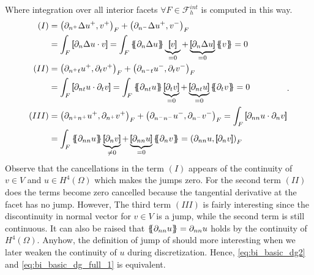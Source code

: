 Where integration over all interior facets $ \forall F \in \mathcal{F}_{h}^{int}$ is computed in this way.
\begin{equation*}
    \begin{split}
        (I) &  =    \left(\partial _{n^{+}} \Delta  u^{+} ,v^{+}\right)_{F} +
        \left(\partial _{n^{-}} \Delta  u^{+} ,v^{-}\right)_{F}  \\
        & =   \int_{F}^{}
        \jump{ \partial _{n} \Delta  u \cdot v } =
         \int_{F}^{}
         \mean{ \partial _{n} \Delta  u } \underbrace{\jump{ v }}_{= 0}    + \underbrace{\jump{ \partial _{n} \Delta  u
         }}_{= 0}    \mean{ v } = 0 \\
        (II) &  =     \left(\partial _{n^{+}t} u^{+}, \partial_{t} v^{+}
        \right)_{F} +  \left(\partial _{n^{-}t} u^{-}, \partial_{t} v^{-}
\right)_{F}   \\
&  =   \int_{F}^{}
        \jump{ \partial _{nt} u \cdot  \partial_{t} v } =
         \int_{F}^{}
         \mean{ \partial _{nt} u    } \underbrace{\jump{ \partial_{t} v }  }_{= 0}    + \underbrace{\jump{ \partial
                 _{nt}  u
         }}_{= 0}    \mean{ \partial _{t}v }  = 0\\
        (III) &  =     \left(\partial _{n^{+}n^{+}} u^{+}, \partial_{n^{+}} v^{+} \right)_{F} +  \left(\partial _{n^{-}n^{-}} u^{-}, \partial_{n^{-}} v^{-} \right)_{F}    =    \int_{F}^{} \jump{ \partial _{nn} u \cdot  \partial_{n} v }  \\
        & = \int_{F}^{}
        \mean{ \partial _{nn} u    } \underbrace{\jump{ \partial_{n} v }  }_{\neq 0}    + \underbrace{\jump{ \partial
                 _{nn}  u
         }}_{= 0}    \mean{ \partial _{n}v }   =  \left( \partial _{nn} u, \jump{ \partial_{n} v } \right)_{F}   \end{split}
.\end{equation*}
Observe that the cancellations in the term $(I)$ appears of the continuity of $v\in V $ and $u\in H^{4}\left( \Omega  \right) $ which makes the jumps zero. For the second term $(II)$ does the terms become zero cancelled because the tangential
derivative at the facet has no jump. However, The third term $(III)$  is fairly interesting since the discontinuity in normal vector for $v \in V$ is a jump, while the second term is still continuous. It can also be raised that $\left\{\!\!\left\{ \partial _{nn} u \right\}\!\!\right\} = \partial _{nn} u  $ holds by the continuity of $H^{4}\left( \Omega  \right) $. Anyhow, the definition of jump of should more interesting when we later weaken the continuity of $u$ during discretization.
Hence, \eqref{eq:bi_basic_dg2} and \eqref{eq:bi_basic_dg_full_1} is equivalent.


